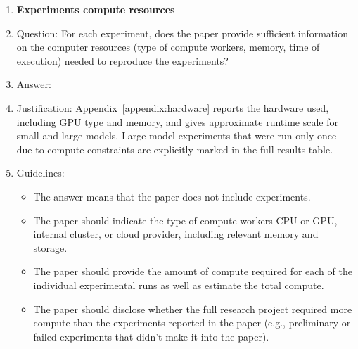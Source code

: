 \documentclass{article}
\theoremstyle{plain}
\theoremstyle{definition}
\theoremstyle{remark}
\begin{document}
\begin{enumerate}
\item {\bf Experiments compute resources}
    \item[] Question: For each experiment, does the paper provide sufficient information on the computer resources (type of compute workers, memory, time of execution) needed to reproduce the experiments?
   \item[] Answer: \answerYes{}
    \item[] Justification: Appendix~\ref{appendix:hardware} reports the hardware used, including GPU type and memory, and gives approximate runtime scale for small and large models. Large-model experiments that were run only once due to compute constraints are explicitly marked in the full-results table.
    \item[] Guidelines:
    \begin{itemize}
        \item The answer \answerNA{} means that the paper does not include experiments.
        \item The paper should indicate the type of compute workers CPU or GPU, internal cluster, or cloud provider, including relevant memory and storage.
        \item The paper should provide the amount of compute required for each of the individual experimental runs as well as estimate the total compute. 
        \item The paper should disclose whether the full research project required more compute than the experiments reported in the paper (e.g., preliminary or failed experiments that didn't make it into the paper). 
    \end{itemize}
    

\end{enumerate}
\end{document}
